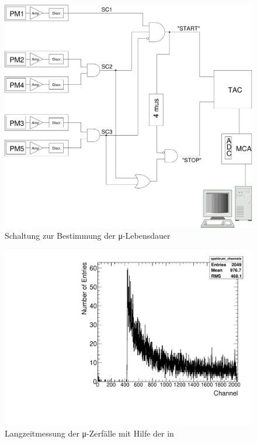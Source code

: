 \begin{figure}[ht!]
  \centering
  \vspace{0.2em}
  \includegraphics[width=\columnwidth,keepaspectratio=true]{muon_messung}
  \caption{Schaltung zur Bestimmung der μ-Lebensdauer}
  \label{fig:muon_schaltung}
\end{figure}


\begin{figure}[ht!]
  \centering
  \includegraphics[width=\columnwidth,keepaspectratio=true]{messung}
  \caption{Langzeitmessung der μ-Zerfälle mit Hilfe der in}
  \label{fig:messung}
\end{figure}


